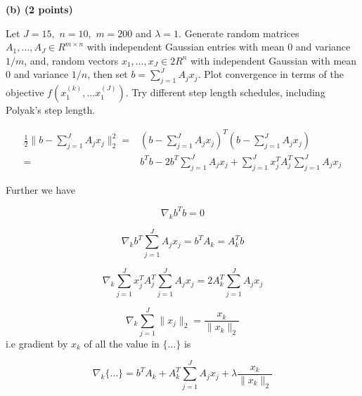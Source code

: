 \documentclass{article}
\begin{document}
\textbf{(b) (2 points)}

Let $J = 15,$ $n = 10,$ $m = 200$ and $\lambda = 1.$ Generate random matrices
$A_1, \dots , A_J \in R^{m\times n}$ with independent Gaussian entries with mean $ 0$ and variance
$1/m$, and, random vectors $x_1, \dots,  x_J \in 2 R^n$ with independent Gaussian with mean
$0$ and variance $1/n$, then set 
$b = \sum_{j = 1}^{J} A_j x_j.$
Plot convergence in terms of the
objective $f(x_1^{(k)}, \dots x_1^{(J)}).$ 
Try different step length schedules, including Polyak's
step length.

\begin{align*}
\frac{1}{2} \lVert b - \sum_{j = 1}^{J} 
A_j x_j \rVert_2^2 = & 
(b - \sum_{j = 1}^{J} A_j x_j)^T (b - \sum_{j = 1}^{J} A_j x_j) \\ = &  
b^T b - 2 b^T \sum_{j = 1}^{J} A_j x_j + \sum_{j = 1}^{J} x_j^T A_j^T \sum_{j = 1}^{J} A_j x_j
\end{align*}

Further we have

$$
\nabla_k b^Tb = 0
$$

$$
\nabla_k b^T \sum_{j = 1}^{J} A_j x_j = 
b^T A_k = A_k^T b
$$

$$
\nabla_k \sum_{j = 1}^{J} x_j^T A_j^T \sum_{j = 1}^{J} A_j x_j 
= 2 A_k^T \sum_{j = 1}^{J} A_j x_j 
$$

$$
\nabla_k  \sum_{j = 1}^{J} \lVert x_j \rVert_2 = \frac{x_k} {\lVert x_k \rVert_2}
$$
i.e gradient by $x_k$ of all the value in 
$\bigg \{ \dots \bigg \}$ is

$$
\nabla_k \bigg \{ \dots \bigg \} = b^T A_k + 
A_k^T \sum_{j = 1}^{J} A_j x_j  + 
\lambda \frac{x_k} {\lVert x_k \rVert_2}
$$
\end{document}
